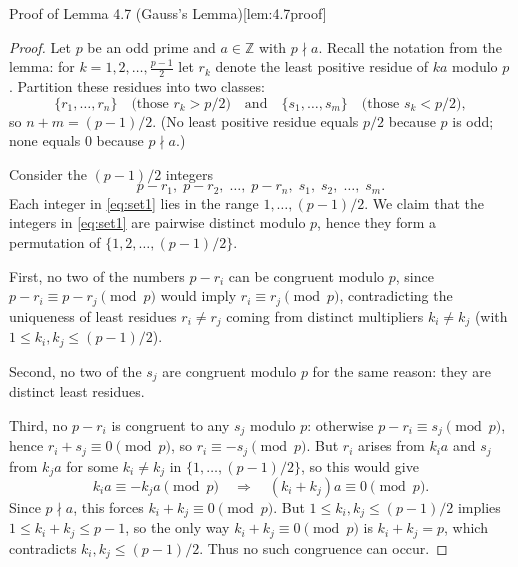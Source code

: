 \documentclass[10pt]{article}
\theoremstyle{definition}
\theoremstyle{plain}
\numberwithin{equation}{section}
\begin{document}
\begin{define}{Proof of Lemma 4.7 (Gauss's Lemma)}[lem:4.7proof]
\begin{proof}
Let $p$ be an odd prime and $a\in\mathbb{Z}$ with $p\nmid a$. Recall the notation from the lemma: for
$k=1,2,\dots,\frac{p-1}{2}$ let $r_k$ denote the least positive residue of $ka$ modulo $p$.
Partition these residues into two classes:
\[
\{r_1,\dots,r_n\} \quad\text{(those }r_k>p/2\text{)}\quad\text{and}\quad
\{s_1,\dots,s_m\} \quad\text{(those }s_k<p/2\text{)},
\]
so $n+m=(p-1)/2$. (No least positive residue equals $p/2$ because $p$ is odd; none equals $0$ because $p\nmid a$.)

Consider the $(p-1)/2$ integers
\begin{equation}\label{eq:set1}
p-r_1,\; p-r_2,\; \dots,\; p-r_n,\; s_1,\; s_2,\; \dots,\; s_m.
\end{equation}
Each integer in \eqref{eq:set1} lies in the range $1,\dots,(p-1)/2$. We claim that the integers in \eqref{eq:set1} are pairwise distinct modulo $p$, hence they form a permutation of
$\{1,2,\dots,(p-1)/2\}$.

First, no two of the numbers $p-r_i$ can be congruent modulo $p$, since $p-r_i\equiv p-r_j\pmod p$
would imply $r_i\equiv r_j\pmod p$, contradicting the uniqueness of least residues $r_i\ne r_j$
coming from distinct multipliers $k_i\ne k_j$ (with $1\le k_i,k_j\le (p-1)/2$).

Second, no two of the $s_j$ are congruent modulo $p$ for the same reason: they are distinct least residues.

Third, no $p-r_i$ is congruent to any $s_j$ modulo $p$: otherwise $p-r_i\equiv s_j\pmod p$, hence
$r_i + s_j \equiv 0\pmod p$, so $r_i\equiv -s_j\pmod p$. But $r_i$ arises from $k_i a$ and $s_j$ from $k_j a$ for some $k_i\ne k_j$ in $\{1,\dots,(p-1)/2\}$, so this would give
\[
k_i a \equiv -k_j a \pmod p \quad\Longrightarrow\quad (k_i + k_j)a \equiv 0\pmod p.
\]
Since $p\nmid a$, this forces $k_i+k_j\equiv 0\pmod p$. But $1\le k_i,k_j\le (p-1)/2$ implies
$1\le k_i+k_j \le p-1$, so the only way $k_i+k_j\equiv 0\pmod p$ is $k_i+k_j=p$, which contradicts $k_i,k_j\le(p-1)/2$. Thus no such congruence can occur.


\end{proof}
\end{define}
\end{document}
